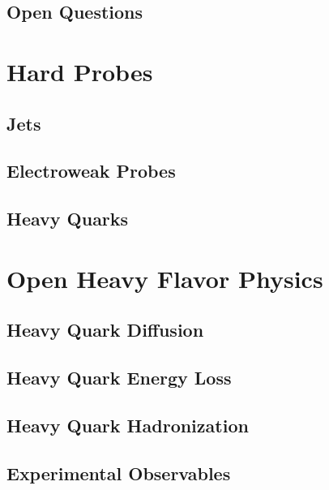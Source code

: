 \subsection{Open Questions}


\section{Hard Probes}

\subsection{Jets}

\subsection{Electroweak Probes}

\subsection{Heavy Quarks}

\section{Open Heavy Flavor Physics}

\subsection{Heavy Quark Diffusion}

\subsection{Heavy Quark Energy Loss}

\subsection{Heavy Quark Hadronization}

\subsection{Experimental Observables}




